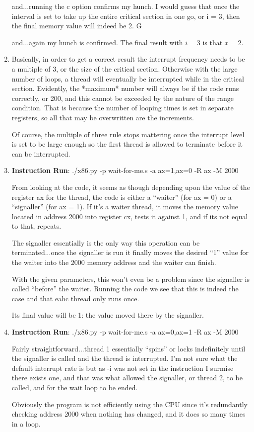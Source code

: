\documentclass{article}
\begin{document}
\begin{enumerate}
and...running the c option confirms my hunch. I would guess that once the interval is set to take
up the entire critical section in one go, or i = 3, then the final memory value will indeed be 2.
G

and...again my hunch is confirmed. The final result with $i = 3$ is that $x = 2$. 

\item Basically, in order to get a correct result the interrupt frequency needs to be a multiple
of 3, or the size of the critical section. Otherwise with the large number of loops, a thread will
eventually be interrupted while in the critical section. Evidently, the *maximum* number will
always be if the code runs correctly, or 200, and this cannot be exceeded by the nature of the 
range condition. That is because the number of looping times is set in separate registers,
so all that may be overwritten are the increments. 

Of course, the multiple of three rule stops mattering once the interrupt level is set to be large
enough so the first thread is allowed to terminate before it can be interrupted. 

\item 

\textbf{Instruction Run}: ./x86.py -p wait-for-me.s -a ax=1,ax=0 -R ax -M 2000

From looking at the code, it seems as though depending upon the value of the register ax for the 
thread, the code is either a ``waiter'' (for ax = 0) or a ``signaller'' (for ax = 1). 
If it's a waiter thread, it moves the memory value located in address 2000 into register cx,
tests it against 1, and if its not equal to that, repeats. 

The signaller essentially is the only way this operation can be terminated...once the signaller
is run it finally moves the desired ``1'' value for the waiter into the 2000 memory address
and the waiter can finish. 

With the given parameters, this won't even be a problem since the signaller is called ``before''
the waiter. Running the code we see that this is indeed the case and that eahc thread only
runs once.

Its final value will be 1: the value moved there by the signaller. 

\item 

\textbf{Instruction Run}: ./x86.py -p wait-for-me.s -a ax=0,ax=1 -R ax -M 2000

Fairly straightforward...thread 1 essentially ``spins'' or locks indefinitely until the signaller
is called and the thread is interrupted. I'm not sure what the default interrupt rate is but
as -i was not set in the instruction I surmise there exists one, and that was what allowed
the signaller, or thread 2, to be called, and for the wait loop to be ended.  

Obviously the program is not efficiently using the CPU since it's redundantly checking address
2000 when nothing has changed, and it does so many times in a loop. 

\end{enumerate}
\end{document}

